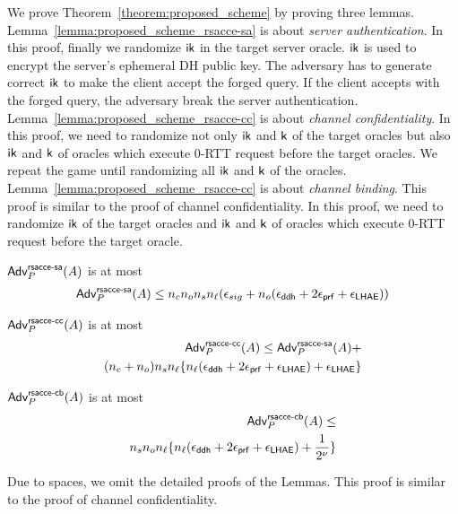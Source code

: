 We prove Theorem~\ref{theorem:proposed_scheme} by proving three lemmas.
Lemma~\ref{lemma:proposed_scheme_rsacce-sa} is about \textit{server authentication}.
In this proof, finally we randomize $\mathsf{ik}$ in the target server oracle.
$\mathsf{ik}$ is used to encrypt the server's ephemeral DH public
key. The adversary has to generate correct $\mathsf{ik}$ to make the client accept
the forged query. If the client accepts with the forged query, the adversary
break the server authentication.
Lemma~\ref{lemma:proposed_scheme_rsacce-cc} is about \textit{channel confidentiality}.
In this proof, we need to randomize not only $\mathsf{ik}$ and $\mathsf{k}$ of the target oracles
but also $\mathsf{ik}$ and $\mathsf{k}$ of oracles which execute 0-RTT request before the target
oracles. We repeat the game until randomizing all $\mathsf{ik}$ and $\mathsf{k}$ of the oracles.
Lemma~\ref{lemma:proposed_scheme_rsacce-cc} is about \textit{channel binding}.
This proof is similar to the proof of channel confidentiality. In this proof, we need
to randomize $\mathsf{ik}$ of the target oracles and $\mathsf{ik}$ and $\mathsf{k}$ of oracles which execute
0-RTT request before the target oracle.

\begin{lemma} \label{lemma:proposed_scheme_rsacce-sa}
 $\mathsf{Adv}^{\mathsf{rsacce\textsc{-} sa}}_{P}(A)$ is at most
 \begin{eqnarray}
  \mathsf{Adv}^{\mathsf{rsacce\textsc{-} sa}}_{P}(A) \leq n_c n_o n_s n_{\ell}
  (\epsilon_{sig} + n_o (\epsilon_{\mathsf{ddh}} + 2\epsilon_{\mathsf{prf}} + \epsilon_{\mathsf{LHAE}}))
 \end{eqnarray}
\end{lemma}
%


\begin{lemma} \label{lemma:proposed_scheme_rsacce-cc}
 $\mathsf{Adv}^{\mathsf{rsacce\textsc{-} cc}}_{P}(A)$ is at most
 \begin{eqnarray}
  \mathsf{Adv}^{\mathsf{rsacce\textsc{-} cc}}_{P}(A) \leq \mathsf{Adv}^{\mathsf{rsacce\textsc{-} sa}}_{P}(A) + \nonumber \\
  (n_c + n_o) n_s n_{\ell} \{ n_{\ell}(\epsilon_{\mathsf{ddh}} + 2\epsilon_{\mathsf{prf}} + \epsilon_{\mathsf{LHAE}})
  + \epsilon_{\mathsf{LHAE}} \}
 \end{eqnarray}
\end{lemma}
%


\begin{lemma} \label{lemma:proposed_scheme_rsacce-cb}
 $\mathsf{Adv}^{\mathsf{rsacce\textsc{-} cb}}_{P}(A)$ is at most
 \begin{eqnarray}
  \mathsf{Adv}^{\mathsf{rsacce\textsc{-} cb}}_{P}(A) \leq \nonumber \\
  n_s n_o n_{\ell} \{ n_{\ell}(\epsilon_{\mathsf{ddh}} + 2\epsilon_{\mathsf{prf}} + \epsilon_{\mathsf{LHAE}}) + \frac{1}{2^{\nu}} \}
 \end{eqnarray}
\end{lemma}
%
Due to spaces, we omit the detailed proofs of the Lemmas.
This proof is similar to the proof of channel confidentiality.

